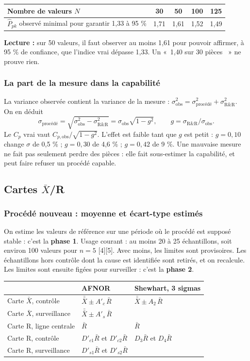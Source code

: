 \documentclass[11pt,a4paper]{article}
\providecommand{\og}{«~}\providecommand{\fg}{~»}
\newcommand{\xbb}{\bar{\bar{X}}}
\newcommand{\Rb}{\bar{R}}
\begin{document}
\begin{center}\small
\begin{tabular}{@{}lcccc@{}}\toprule
Nombre de valeurs $N$ & 30 & 50 & 100 & 125\\\midrule
$\hat P_{pk}$ observé minimal pour garantir 1,33 à 95 \% & 1,71 & 1,61 & 1,52 & 1,49\\\bottomrule
\end{tabular}
\end{center}
\textbf{Lecture :} sur 50 valeurs, il faut observer au moins 1,61 pour pouvoir affirmer, à 95 \% de confiance, que l'indice vrai dépasse 1,33. Un \og 1,40 sur 30 pièces \fg{} ne prouve rien.

\subsubsection{La part de la mesure dans la capabilité}
La variance observée contient la variance de la mesure : $\sigma^2_{\text{obs}}=\sigma^2_{\text{procédé}}+\sigma^2_{\text{R\&R}}$. On en déduit
\[
\sigma_{\text{procédé}}=\sqrt{\sigma^2_{\text{obs}}-\sigma^2_{\text{R\&R}}}=\sigma_{\text{obs}}\sqrt{1-g^2},\qquad g=\sigma_{\text{R\&R}}/\sigma_{\text{obs}} .
\]
Le $C_p$ vrai vaut $C_{p,\text{obs}}/\sqrt{1-g^2}$. L'effet est faible tant que $g$ est petit : $g=0{,}10$ change $\sigma$ de 0,5 \% ; $g=0{,}30$ de 4,6 \% ; $g=0{,}42$ de 9 \%. Une mauvaise mesure ne fait pas seulement perdre des pièces : elle fait sous-estimer la capabilité, et peut faire refuser un procédé capable.

\subsection{Cartes \texorpdfstring{$\bar X$}{X}/R}\label{sec:xbarr}
\subsubsection{Procédé nouveau : moyenne et écart-type estimés}
On estime les valeurs de référence sur une période où le procédé est supposé stable : c'est la \textbf{phase 1}. Usage courant : au moins 20 à 25 échantillons, soit environ 100 valeurs pour $n=5$ [4][5]. Avec moins, les limites sont provisoires. Les échantillons hors contrôle dont la cause est identifiée sont retirés, et on recalcule. Les limites sont ensuite figées pour surveiller : c'est la \textbf{phase 2}.
\begin{center}\small
\renewcommand{\arraystretch}{1.45}
\begin{tabular}{@{}lll@{}}\toprule
 & \textbf{AFNOR} & \textbf{Shewhart, 3 sigmas}\\\midrule
Carte $\bar X$, contrôle & $\xbb\pm A'_c\,\Rb$ & $\xbb\pm A_2\,\Rb$\\
Carte $\bar X$, surveillance & $\xbb\pm A'_s\,\Rb$ & \\
Carte R, ligne centrale & $\Rb$ & $\Rb$\\
Carte R, contrôle & $D'_{c1}\Rb$ et $D'_{c2}\Rb$ & $D_3\Rb$ et $D_4\Rb$\\
Carte R, surveillance & $D'_{s1}\Rb$ et $D'_{s2}\Rb$ & \\\bottomrule
\end{tabular}
\end{center}
\end{document}
